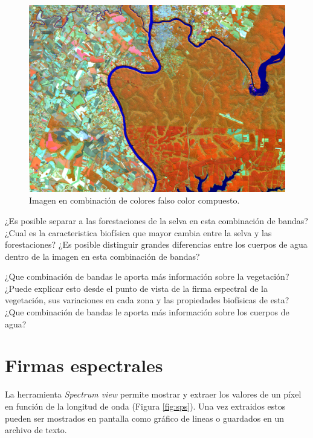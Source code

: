 \documentclass[a4paper,10pt]{book}
\begin{document}
\begin{figure}[h!]
    \centering
    \includegraphics[scale=0.5]{fig:SNR.png}
    \caption{Imagen en combinación de colores falso color compuesto.}
    \label{fig:SNR}
\end{figure}


\begin{que}
    ¿Es posible separar a las forestaciones de la selva en esta combinación de bandas? ¿Cual es la caracteristica biofísica que mayor cambia entre la selva y las forestaciones? ¿Es posible distinguir grandes diferencias entre los cuerpos de agua dentro de la imagen en esta combinación de bandas?
\end{que}

\begin{que}
    ¿Que combinación de bandas le aporta más información sobre la vegetación? ¿Puede explicar esto desde el punto de vista de la firma espectral de la vegetación, sus variaciones en cada zona y las propiedades biofísicas de esta? ¿Que combinación de bandas le aporta más información sobre los cuerpos de agua?
\end{que}

\section{Firmas espectrales}

La herramienta \emph{Spectrum view} permite mostrar y extraer los valores de un píxel en función de la longitud de onda (Figura \ref{fig:sps}). Una vez extraidos estos pueden ser mostrados en pantalla como gráfico de lineas o guardados en un archivo de texto.
\end{document}
